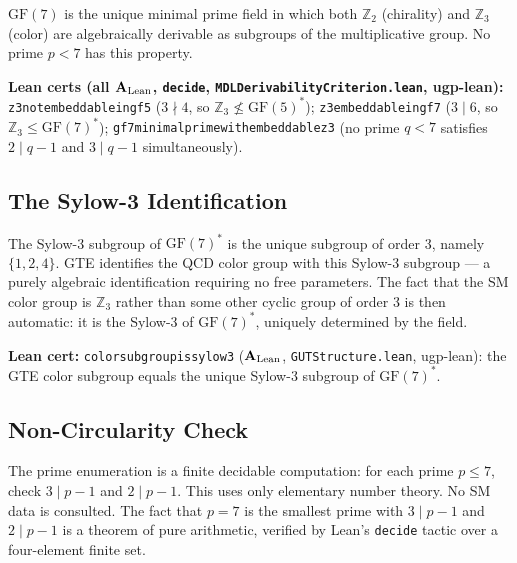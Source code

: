 \documentclass[11pt,openany]{book}
\theoremstyle{remark}
\newcommand{\lean}[1]{%
  \penalty-100
  \begingroup\def\_{\textunderscore\allowbreak}\texttt{#1}\endgroup}
\newcommand{\CatAL}{\ensuremath{\textbf{A}_{\rm Lean}}}
\begin{document}
\begin{tcolorbox}[colback=orange!5,colframe=orange!60,
  title={Result: GF(7) Minimality --- A Minimal-Prime Theorem (\CatAL)}]
$\mathrm{GF}(7)$ is the unique minimal prime field in which both $\mathbb{Z}_2$
(chirality) and $\mathbb{Z}_3$ (color) are algebraically derivable as subgroups of
the multiplicative group. No prime $p < 7$ has this property.

\smallskip\noindent
\textbf{Lean certs (all \CatAL, \texttt{decide}, \texttt{MDLDerivabilityCriterion.lean}, ugp-lean):}
\lean{z3\_not\_embeddable\_in\_gf5} ($3 \nmid 4$, so $\mathbb{Z}_3 \not\leq \mathrm{GF}(5)^*$);
\lean{z3\_embeddable\_in\_gf7} ($3 \mid 6$, so $\mathbb{Z}_3 \leq \mathrm{GF}(7)^*$);
\lean{gf7\_minimal\_prime\_with\_embeddable\_z3} (no prime $q < 7$ satisfies
$2 \mid q-1$ and $3 \mid q-1$ simultaneously).
\end{tcolorbox}

\subsection*{The Sylow-3 Identification}

The Sylow-3 subgroup of $\mathrm{GF}(7)^*$ is the unique subgroup of order 3, namely
$\{1,2,4\}$. GTE identifies the QCD color group with this Sylow-3 subgroup ---
a purely algebraic identification requiring no free parameters. The fact that the SM
color group is $\mathbb{Z}_3$ rather than some other cyclic group of order 3 is then
automatic: it is the Sylow-3 of $\mathrm{GF}(7)^*$, uniquely determined by the
field.

\textbf{Lean cert:} \lean{color\_subgroup\_is\_sylow3} (\CatAL, \texttt{GUTStructure.lean},
ugp-lean): the GTE color subgroup equals the unique Sylow-3 subgroup of
$\mathrm{GF}(7)^*$.

\subsection*{Non-Circularity Check}

The prime enumeration is a finite decidable computation: for each prime $p \leq 7$,
check $3 \mid p-1$ and $2 \mid p-1$. This uses only elementary number theory. No
SM data is consulted. The fact that $p = 7$ is the smallest prime with $3 \mid p-1$
and $2 \mid p-1$ is a theorem of pure arithmetic, verified by Lean's \texttt{decide}
tactic over a four-element finite set.

\end{document}
